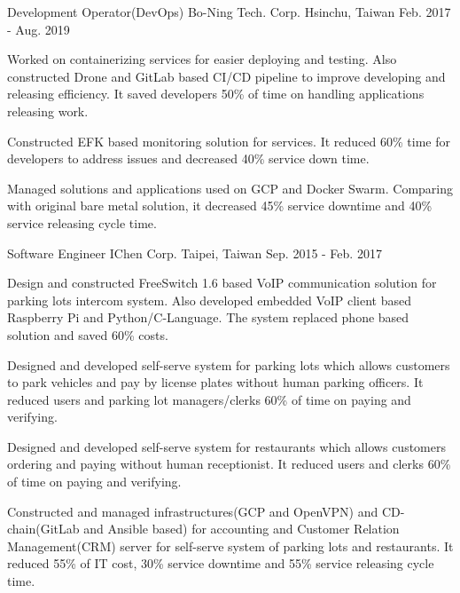 \begin{cventries}
    \cventry
        {Development Operator(DevOps)}
        {Bo-Ning Tech. Corp.}
        {Hsinchu, Taiwan}
        {Feb. 2017 - Aug. 2019}
        {
            \begin{cvitems}
                \item
                    {
                        Worked on containerizing services for easier deploying and testing. Also constructed Drone and GitLab based CI/CD pipeline to improve developing and releasing efficiency. It saved developers 50\% of time on handling applications releasing work.
                    }
                \item
                    {
                        Constructed EFK based monitoring solution for services. It reduced 60\% time for developers to address issues and decreased 40\% service down time.
                    }
                \item
                    {
                        Managed solutions and applications used on GCP and Docker Swarm. Comparing with original bare metal solution, it decreased 45\% service downtime and 40\% service releasing cycle time. 
                    }
            \end{cvitems}
        }

    \cventry
        {Software Engineer}
        {IChen Corp.}
        {Taipei, Taiwan}
        {Sep. 2015 - Feb. 2017}
        {
            \begin{cvitems}
                \item
                    {
                        Design and constructed FreeSwitch 1.6 based VoIP communication solution for parking lots intercom system. Also developed embedded VoIP client based Raspberry Pi and Python/C-Language. The system replaced phone based solution and saved 60\% costs.
                    }
                \item
                    {
                        Designed and developed self-serve system for parking lots which allows customers to park vehicles and pay by license plates without human parking officers. It reduced users and parking lot managers/clerks 60\% of time on paying and verifying.
                    }
                \item
                    {
                        Designed and developed self-serve system for restaurants which allows customers ordering and paying without human receptionist. It reduced users and clerks 60\% of time on paying and verifying.
                    }
                \item
                    {
                        Constructed and managed infrastructures(GCP and OpenVPN) and CD-chain(GitLab and Ansible based) for accounting and Customer Relation Management(CRM) server for self-serve system of parking lots and restaurants. It reduced 55\% of IT cost, 30\% service downtime and 55\% service releasing cycle time.
                    }
            \end{cvitems}
        }
        

\end{cventries}
